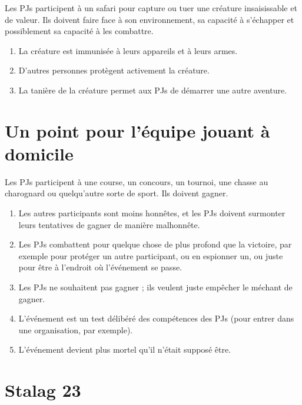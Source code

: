 \begin{multicols}{2}

Les PJs participent à un safari pour capture ou tuer une créature insaisissable et de valeur. Ils doivent faire face à son environnement, sa capacité à s'échapper et possiblement sa capacité à les combattre.

\themes
\begin{enumerate}
\item La créature est immunisée à leurs appareils et à leurs armes.
\item D'autres personnes protègent activement la créature.
\item La tanière de la créature permet aux PJs de démarrer une autre aventure.
\end{enumerate}

\section{Un point pour l'équipe jouant à domicile}
\label{domicile}


Les PJs participent à une course, un concours, un tournoi, une chasse au charognard ou quelqu'autre sorte de sport. Ils doivent gagner.

\themes
\begin{enumerate}
\item Les autres participants sont moins honnêtes, et les PJs doivent surmonter leurs tentatives de gagner de manière malhonnête.
\item Les PJs combattent pour quelque chose de plus profond que la victoire, par exemple pour protéger un autre participant, ou en espionner un, ou juste pour être à l'endroit où l'événement se passe.
\item Les PJs ne souhaitent pas gagner ; ils veulent juste empêcher le méchant de gagner.
\item L'événement est un test délibéré des compétences des PJs (pour entrer dans une organisation, par exemple).
\item L'événement devient plus mortel qu'il n'était supposé être.
\end{enumerate}

\section{Stalag 23}
\label{stalag}



\end{multicols}
